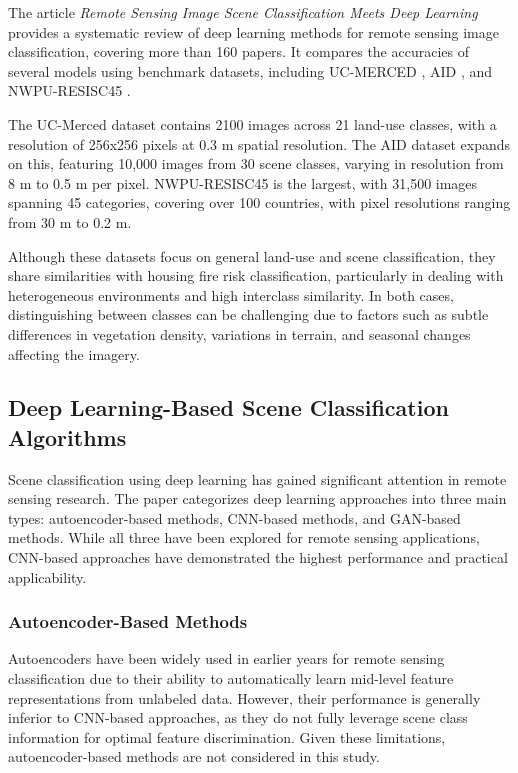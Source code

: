 The article \textit{Remote Sensing Image Scene Classification Meets Deep Learning} 
\cite{cheng2020remote} provides a systematic review of deep learning methods for remote 
sensing image classification, covering more than 160 papers. It compares the accuracies 
of several models using benchmark datasets, including UC-MERCED \cite{yang2010bag}, AID 
\cite{xia2017aid}, and NWPU-RESISC45 \cite{cheng2017remote}.

The UC-Merced dataset contains 2100 images across 21 land-use classes, with a resolution of 
256x256 pixels at 0.3 m spatial resolution. The AID dataset expands on this, featuring 10,000 
images from 30 scene classes, varying in resolution from 8 m to 0.5 m per pixel. NWPU-RESISC45 
is the largest, with 31,500 images spanning 45 categories, covering over 100 countries, with
pixel resolutions ranging from 30 m to 0.2 m.

Although these datasets focus on general land-use and scene classification, they share similarities 
with housing fire risk classification, particularly in dealing with heterogeneous environments and high 
interclass similarity. In both cases, distinguishing between classes can be challenging due to 
factors such as subtle differences in vegetation density, variations in terrain, and seasonal 
changes affecting the imagery.

\subsection{Deep Learning-Based Scene Classification Algorithms}

Scene classification using deep learning has gained significant attention in remote sensing research. 
The paper \cite{cheng2020remote} categorizes deep learning approaches into three main types: autoencoder-based methods, 
CNN-based methods, and GAN-based methods. While all three have been explored for remote sensing applications, 
CNN-based approaches have demonstrated the highest performance and practical applicability.

\subsubsection{Autoencoder-Based Methods}
Autoencoders have been widely used in earlier years for remote sensing classification due to their ability 
to automatically learn mid-level feature representations from unlabeled data. However, their performance 
is generally inferior to CNN-based approaches, as they do not fully leverage scene class information 
for optimal feature discrimination. Given these limitations, autoencoder-based methods 
are not considered in this study.

